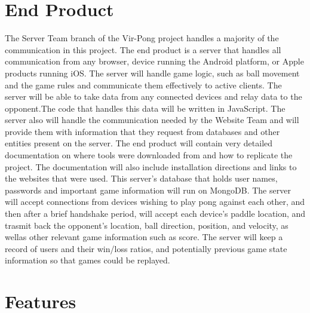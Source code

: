 \documentclass[letterpaper,12pt]{article}
\begin{document}
\section{End Product}
	The Server Team branch of the Vir-Pong project handles a majority of the communication in this project. The end product is a server that handles all communication from any browser, device running the Android platform, or Apple products running iOS. The server will handle game logic, such as ball movement and the game rules and communicate them effectively to active clients. The server will be able to take data from any connected devices and relay data to the opponent.The code that handles this data will be written in JavaScript. The server also will handle the communication needed by the Website Team and will provide them with information that they request from databases and other entities present on the server. The end product will contain very detailed documentation on where tools were downloaded from and how to replicate the project. The documentation will also include installation directions and links to the websites that were used. This server’s database that holds user names, passwords and important game information will run on MongoDB.
The server will accept connections from devices wishing to play pong against each other, and then after a brief handshake period, will accept each device's paddle location, and trasmit back the opponent's location, ball direction, position, and velocity, as wellas other relevant game information such as score. The server will keep a record of users and their win/loss ratios, and potentially previous game state information so that games could be replayed.
\section{Features}
\end{document}
